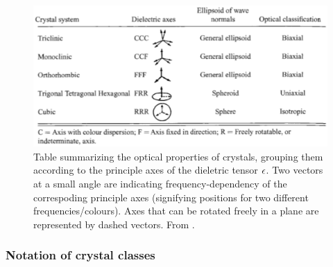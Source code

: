 \begin{figure}
\includegraphics[width=\pltw]{figures/crystal_ellipsoid.pdf}
\caption{
    Table summarizing the optical properties of crystals, grouping them 
    according to the principle axes of the dieletric tensor $\epsilon$. 
    Two vectors at a small angle are indicating frequency-dependency 
    of the correspoding principle axes (signifying positions for two different 
    frequencies/colours). Axes that can be rotated freely in a plane are represented 
    by dashed vectors. 
    From \cite{born1999principles}. }
\label{fig:crystal_ellipsoid}
\end{figure}

\subsubsection{Notation of crystal classes}

